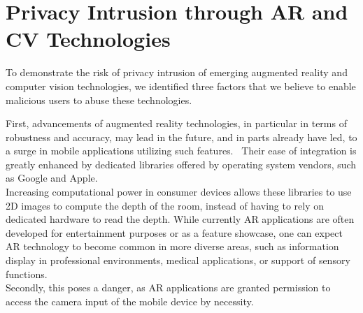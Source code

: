 
\section{Privacy Intrusion through AR and CV Technologies}

To demonstrate the risk of privacy intrusion of emerging augmented reality and computer vision technologies, we identified three factors that we believe to enable malicious users to abuse these technologies.

First, advancements of augmented reality technologies, in particular in terms of robustness and accuracy, may lead in the future, and in parts already have led, to a surge in mobile applications utilizing such features.~\cite{HCI-049}
Their ease of integration is greatly enhanced by dedicated libraries offered by operating system vendors, such as Google and Apple.\\
Increasing computational power in consumer devices allows these libraries to use 2D images to compute the depth of the room, instead of having to rely on dedicated hardware to read the depth.
While currently AR applications are often developed for entertainment purposes or as a feature showcase, one can expect AR technology to become common in more diverse areas, such as information display in professional environments, medical applications, or support of sensory functions.\\
Secondly, this poses a danger, as AR applications are granted permission to access the camera input of the mobile device by necessity.
